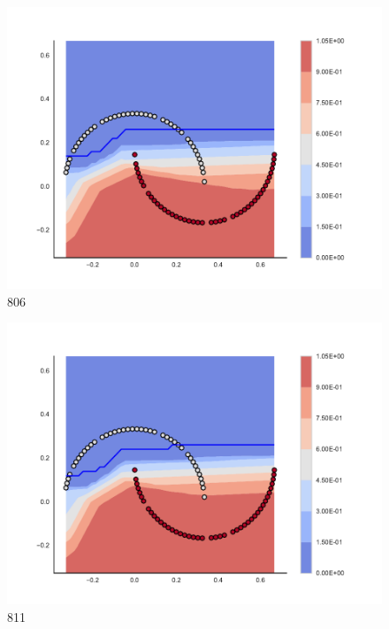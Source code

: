 \begin{subfigure}[b]{0.09\textwidth}
    \includegraphics[clip, trim=2.35cm 1.75cm 4.5cm 0cm,width=\textwidth]{img/convergence/806.pdf}
    \caption{806}
    \label{fig:convergence_806}
\end{subfigure}
%
\begin{subfigure}[b]{0.09\textwidth}
    \includegraphics[clip, trim=2.35cm 1.75cm 4.5cm 0cm,width=\textwidth]{img/convergence/811.pdf}
    \caption{811}
    \label{fig:convergence_811}
\end{subfigure}
%
